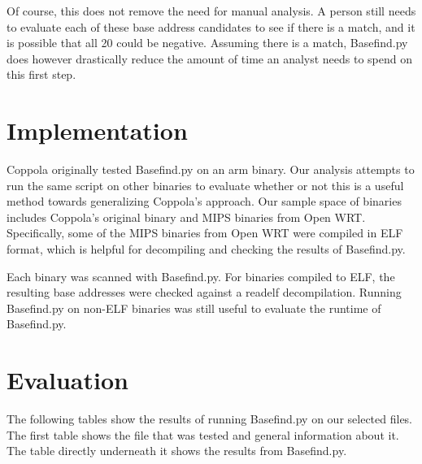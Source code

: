 \documentclass[letterpaper,twocolumn,10pt]{article}
\begin{document}
Of course, this does not remove the need for manual analysis. A person still needs to evaluate each of these base address candidates to see if there is a match, and it is possible that all 20 could be negative. Assuming there is a match, Basefind.py does however drastically reduce the amount of time an analyst needs to spend on this first step. 

\section{Implementation}
Coppola\cite{cloudscale2013} originally tested Basefind.py on an arm binary. Our analysis attempts to run the same script on other binaries to evaluate whether or not this is a useful method towards generalizing Coppola's approach. Our sample space of binaries includes Coppola's original binary and MIPS binaries from Open WRT. Specifically, some of the MIPS binaries from Open WRT were compiled in ELF format, which is helpful for decompiling and checking the results of Basefind.py.

Each binary was scanned with Basefind.py. For binaries compiled to ELF, the resulting base addresses were checked against a readelf decompilation. Running Basefind.py on non-ELF binaries was still useful to evaluate the runtime of Basefind.py.

\section{Evaluation}
The following tables show the results of running Basefind.py on our selected files.
The first table shows the file that was tested and general information about it. The table directly underneath it shows the results from Basefind.py. 
\end{document}
